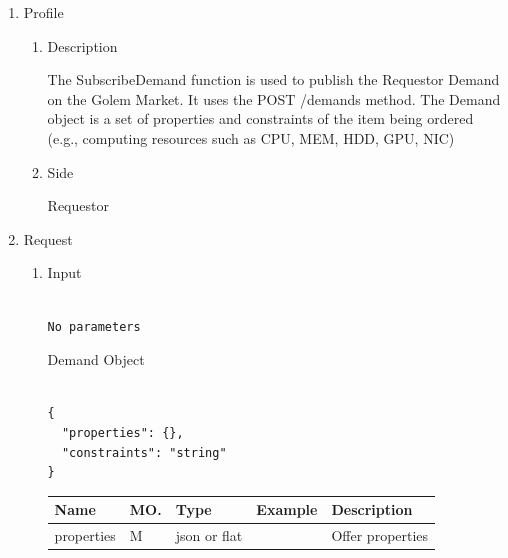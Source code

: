 \begin{enumerate}

\item Profile

\begin{enumerate}

\item Description

The SubscribeDemand function is used to publish the Requestor Demand on the Golem Market. It uses the POST /demands method.
The Demand object is a set of properties and constraints of the item being ordered (e.g., computing resources such as CPU, MEM, HDD, GPU, NIC)

\item Side

Requestor

\end{enumerate}

\item Request

\begin{enumerate}

\item Input

\begin{tcolorbox}[boxrule=0pt, frame empty]
\begin{verbatim}

No parameters

\end{verbatim}
\end{tcolorbox}

Demand Object

\begin{tcolorbox}[boxrule=0pt, frame empty]
\begin{verbatim}

{
  "properties": {},
  "constraints": "string"
}

\end{verbatim}
\end{tcolorbox}

\begin{table}[H]
\footnotesize

\begin{center}
\begin{tabular}{|p{3cm}|l|p{3cm}|p{3cm}|p{4cm}|} 
\hline
\rowcolor{lightgray}	Name	& MO.	& Type	& Example & 	Description \\
\hline

properties	& M	& 	json or flat	&		&	Offer properties \\ 


\end{tabular}
\end{center}
\end{table}
\end{enumerate}
\end{enumerate}
